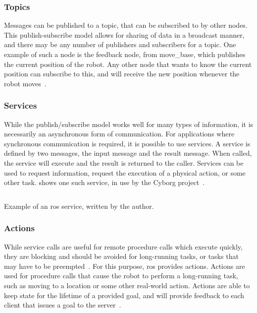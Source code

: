 \documentclass[\rootfolder/main.tex]{subfiles}
\begin{document}
\subsubsection{Topics}

Messages can be published to a topic, that can be subscribed to by other nodes.
This publish-subscribe model allows for sharing of data in a broadcast manner, and there may be any number of publishers and subscribers for a topic.
One example of such a node is the feedback node, from move\_base, which publishes the current position of the robot.
Any other node that wants to know the current position can subscribe to this, and will receive the new position whenever the robot moves~\cite{Quigley2009}.

\subsubsection{Services}

While the publish/subscribe model works well for many types of information, it is necessarily an asynchronous form of communication.
For applications where synchronous communication is required, it is possible to use services.
A service is defined by two messages, the input message and the result message.
When called, the service will execute and the result is returned to the caller.
Services can be used to request information, request the execution of a physical action, or some other task.
 shows one such service, in use by the Cyborg project~\cite{Quigley2009}.

\begin{listing}
    \inputminted{python}{\rootfolder/Chapters/Chapter2/Listings/distance_to_goal.py}
    \caption{Example of an \acrshort{ros} service, written by the author.}
    \label{lst:ros_service}
\end{listing}

\subsubsection{Actions}

While service calls are useful for remote procedure calls which execute quickly, they are blocking and should be avoided for long-running tasks, or tasks that may have to be preempted~\cite{ROS}.
For this purpose, \acrshort{ros} provides actions.
Actions are used for procedure calls that cause the robot to perform a long-running task, such as moving to a location or some other real-world action.
Actions are able to keep state for the lifetime of a provided goal, and will provide feedback to each client that issues a goal to the server~\cite{Quigley2009}.
\end{document}
